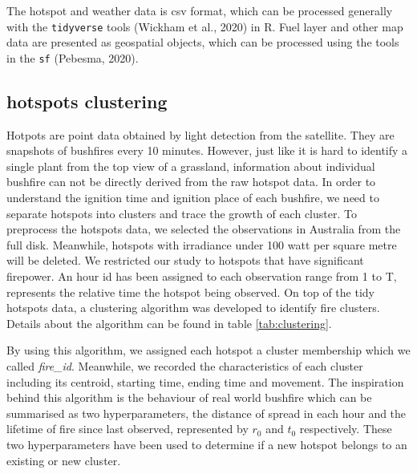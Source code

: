 \documentclass{monashthesis}
\begin{document}
The hotspot and weather data is csv format, which can be processed
generally with the \texttt{tidyverse} tools (Wickham et al., 2020) in R.
Fuel layer and other map data are presented as geospatial objects, which
can be processed using the tools in the \texttt{sf} (Pebesma, 2020).

\subsection{hotspots clustering}\label{hotspots-clustering}

Hotpots are point data obtained by light detection from the satellite.
They are snapshots of bushfires every 10 minutes. However, just like it
is hard to identify a single plant from the top view of a grassland,
information about individual bushfire can not be directly derived from
the raw hotspot data. In order to understand the ignition time and
ignition place of each bushfire, we need to separate hotspots into
clusters and trace the growth of each cluster. To preprocess the
hotspots data, we selected the observations in Australia from the full
disk. Meanwhile, hotspots with irradiance under 100 watt per square
metre will be deleted. We restricted our study to hotspots that have
significant firepower. An hour id has been assigned to each observation
range from 1 to T, represents the relative time the hotspot being
observed. On top of the tidy hotspots data, a clustering algorithm was
developed to identify fire clusters. Details about the algorithm can be
found in table \ref{tab:clustering}.

By using this algorithm, we assigned each hotspot a cluster membership
which we called \emph{fire\_id}. Meanwhile, we recorded the
characteristics of each cluster including its centroid, starting time,
ending time and movement. The inspiration behind this algorithm is the
behaviour of real world bushfire which can be summarised as two
hyperparameters, the distance of spread in each hour and the lifetime of
fire since last observed, represented by \(r_0\) and \(t_0\)
respectively. These two hyperparameters have been used to determine if a
new hotspot belongs to an existing or new cluster.

\normalfont
\end{document}
